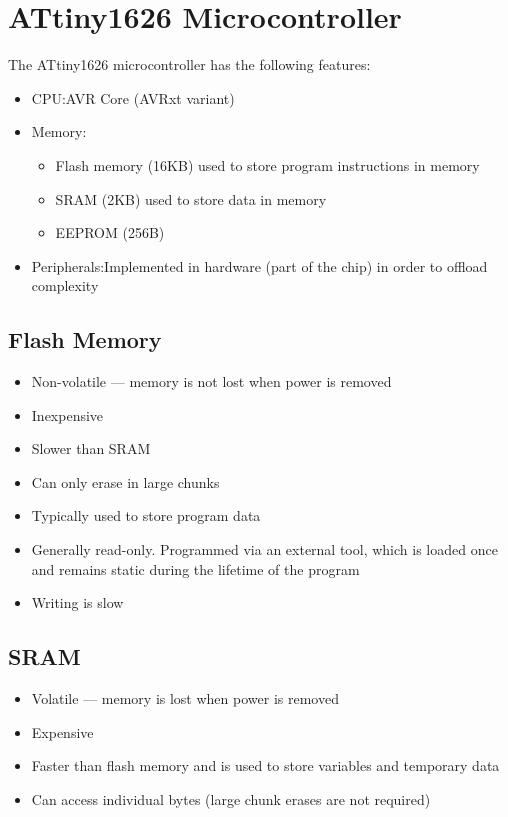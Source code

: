 \documentclass{report}
\begin{document}
\section{ATtiny1626 Microcontroller}
The ATtiny1626 microcontroller has the following features:
\begin{itemize}
    \item CPU:\@ AVR Core (AVRxt variant)
    \item Memory:\@
          \begin{itemize}
              \item Flash memory (16KB) used to store program instructions in memory
              \item SRAM (2KB) used to store data in memory
              \item EEPROM (256B)
          \end{itemize}
    \item Peripherals:\@ Implemented in hardware (part of the chip) in order to offload complexity
\end{itemize}
\subsection{Flash Memory}
\begin{itemize}
    \item Non-volatile --- memory is not lost when power is removed
    \item Inexpensive
    \item Slower than SRAM
    \item Can only erase in large chunks
    \item Typically used to store program data
    \item Generally read-only. Programmed via an external tool, which is loaded once and remains static during the lifetime of the program
    \item Writing is slow
\end{itemize}
\subsection{SRAM}
\begin{itemize}
    \item Volatile --- memory is lost when power is removed
    \item Expensive
    \item Faster than flash memory and is used to store variables and temporary data
    \item Can access individual bytes (large chunk erases are not required)
\end{itemize}
\end{document}
